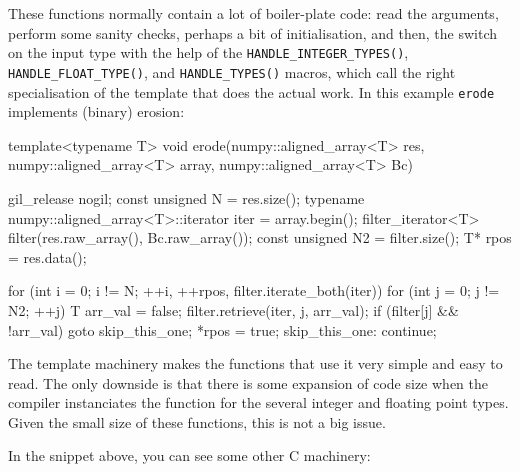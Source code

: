 \documentclass{article}
\newcommand*{\cpp}{{C\nolinebreak[4]\hspace{-.05em}\raisebox{.4ex}{\tiny\textbf{++}}}}
\let\code\texttt
\begin{document}
These functions normally contain a lot of boiler-plate code: read the
arguments, perform some sanity checks, perhaps a bit of initialisation, and
then, the switch on the input type with the help of the
\code{HANDLE\_INTEGER\_TYPES()}, \code{HANDLE\_FLOAT\_TYPE()}, and
\code{HANDLE\_TYPES()} macros, which call the right specialisation of the
template that does the actual work. In this example \code{erode} implements
(binary) erosion:

\begin{cplusplus}
template<typename T>
void erode(numpy::aligned_array<T> res,
            numpy::aligned_array<T> array,
            numpy::aligned_array<T> Bc) {
    gil_release nogil;
    const unsigned N = res.size();
    typename numpy::aligned_array<T>::iterator iter = array.begin();
    filter_iterator<T> filter(res.raw_array(), Bc.raw_array());
    const unsigned N2 = filter.size();
    T* rpos = res.data();

    for (int i = 0;
                i != N;
                ++i, ++rpos, filter.iterate_both(iter)) {
        for (int j = 0; j != N2; ++j) {
            T arr_val = false;
            filter.retrieve(iter, j, arr_val);
            if (filter[j] && !arr_val) {
                goto skip_this_one;
            }
        }
        *rpos = true;
        skip_this_one: continue;
    }
}
\end{cplusplus}

The template machinery makes the functions that use it very simple and easy to
read. The only downside is that there is some expansion of code size when the
compiler instanciates the function for the several integer and floating point
types. Given the small size of these functions, this is not a big issue.

In the snippet above, you can see some other \cpp{} machinery:
\end{document}
